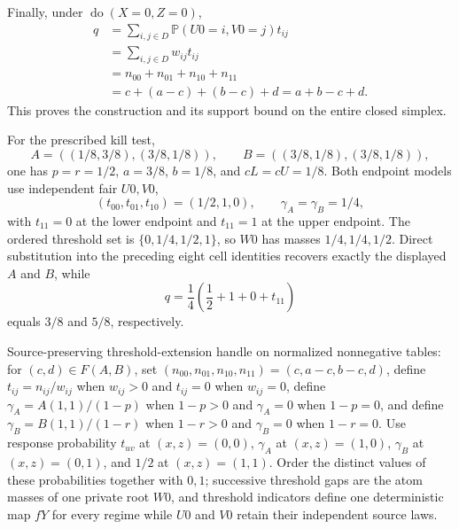 Finally, under \(\operatorname{do}(X=0,Z=0)\),
\[
\begin{aligned}
q
&=\sum_{i,j\in D}\mathbb P(U0=i,V0=j)t_{ij}\\
&=\sum_{i,j\in D}w_{ij}t_{ij}\\
&=n_{00}+n_{01}+n_{10}+n_{11}\\
&=c+(a-c)+(b-c)+d=a+b-c+d.
\end{aligned}
\]
This proves the construction and its support bound on the entire closed simplex.

For the prescribed kill test,
\[
A=((1/8,3/8),(3/8,1/8)),
\qquad
B=((3/8,1/8),(3/8,1/8)),
\]
one has \(p=r=1/2\), \(a=3/8\), \(b=1/8\), and \(cL=cU=1/8\).  Both endpoint models use independent fair \(U0,V0\),
\[
(t_{00},t_{01},t_{10})=(1/2,1,0),
\qquad
\gamma_A=\gamma_B=1/4,
\]
with \(t_{11}=0\) at the lower endpoint and \(t_{11}=1\) at the upper endpoint.  The ordered threshold set is \(\{0,1/4,1/2,1\}\), so \(W0\) has masses \(1/4,1/4,1/2\).  Direct substitution into the preceding eight cell identities recovers exactly the displayed \(A\) and \(B\), while
\[
q=\frac14\left(\frac12+1+0+t_{11}\right)
\]
equals \(3/8\) and \(5/8\), respectively.

Source-preserving threshold-extension handle on normalized nonnegative tables: for \((c,d)\in F(A,B)\), set \((n_{00},n_{01},n_{10},n_{11})=(c,a-c,b-c,d)\), define \(t_{ij}=n_{ij}/w_{ij}\) when \(w_{ij}>0\) and \(t_{ij}=0\) when \(w_{ij}=0\), define \(\gamma_A=A(1,1)/(1-p)\) when \(1-p>0\) and \(\gamma_A=0\) when \(1-p=0\), and define \(\gamma_B=B(1,1)/(1-r)\) when \(1-r>0\) and \(\gamma_B=0\) when \(1-r=0\).  Use response probability \(t_{uv}\) at \((x,z)=(0,0)\), \(\gamma_A\) at \((x,z)=(1,0)\), \(\gamma_B\) at \((x,z)=(0,1)\), and \(1/2\) at \((x,z)=(1,1)\).  Order the distinct values of these probabilities together with \(0,1\); successive threshold gaps are the atom masses of one private root \(W0\), and threshold indicators define one deterministic map \(fY\) for every regime while \(U0\) and \(V0\) retain their independent source laws.

